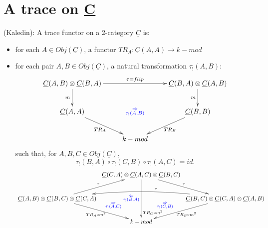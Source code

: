 \section{A trace on \underline{C}} \label{sec:2cat_trace_eg}
%
\begin{defn} \label{def:trace_functor}
(Kaledin): A trace functor on a 
2-category $\underline{C}$ is:
\begin{itemize}
	\item for each $A \in Obj(\underline{C})$, a functor 
	$TR_A: \underline{C}(A,A) \to k-mod$
	\item for each pair $A, B \in Obj(\underline{C})$, a natural transformation
	$\tau_!(A,B)$:
	$$\xymatrix{
	\underline{C}(A,B) \otimes \underline{C}(B,A)
	\ar[rr]^{\tau = flip}
	\ar[d]_{m}
	&& \underline{C}(B,A) \otimes \underline{C}(A,B)
	\ar[d]_{m} \\
	\underline{C}(A,A)
	\ar[rd]_{TR_A}
	& \textcolor{blue}{\substack{\Rightarrow\\ \tau_!(A,B)}}
	& \underline{C}(B,B) 
	\ar[ld]^{TR_B}\\
	& k-mod
	}$$
	such that, for $A,B,C \in Obj(\underline{C})$, 
	\begin{equation*} 
	\tau_!(B,A) \circ \tau_!(C,B) \circ \tau_!(A,C) = id.
	\end{equation*}
	$$\xymatrixcolsep{0.25pc}
	\xymatrix{
	& \underline{C}(C,A) \otimes \underline{C}(A,C) \otimes \underline{C}(B,C) 
	\ar[rd]^{\tau}
	\ar[dd]_{\textcolor{blue}{
		\substack{\Leftarrow\\ \tau_!(B,A)}}}^{\substack{
		\\\\\\\\\\\\\\\\\\TR_C \circ m^2}}\\
	\underline{C}(A,B) \otimes \underline{C}(B,C) \otimes \underline{C}(C,A) 
	\ar[ru]^{\tau}
	\ar[rd]^{\textcolor{blue}{\quad \quad \quad \substack{\Rightarrow\\ \tau_!(A,C)}}}_{TR_A\circ m^2}
	&& \underline{C}(B,C) \otimes \underline{C}(C,A) \otimes \underline{C}(A,B)
	\ar@/_1pc/[ll]_{\quad \quad \quad \quad \quad \tau}
	\ar[ld]_{\textcolor{blue}{\substack{\Rightarrow\\ \tau_!(C,B)}}\quad \quad\quad \quad}^{TR_B \circ m^2}\\
	& k-mod
	}$$
\end{itemize}
\end{defn}
